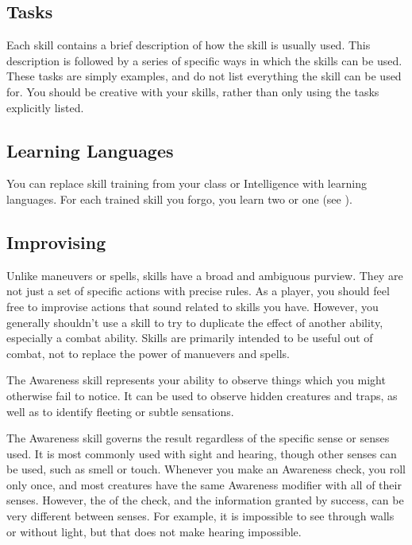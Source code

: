     \subsection{Tasks}\label{Tasks}
        Each skill contains a brief description of how the skill is usually used.
        This description is followed by a series of specific ways in which the skills can be used.
        These tasks are simply examples, and do not list everything the skill can be used for.
        You should be creative with your skills, rather than only using the tasks explicitly listed.

    \subsection{Learning Languages}
        You can replace skill training from your class or Intelligence with learning languages.
        For each trained skill you forgo, you learn two  or one  (see ).

    \subsection{Improvising}
        Unlike maneuvers or spells, skills have a broad and ambiguous purview.
        They are not just a set of specific actions with precise rules.
        As a player, you should feel free to improvise actions that sound related to skills you have.
        However, you generally shouldn't use a skill to try to duplicate the effect of another ability, especially a combat ability.
        Skills are primarily intended to be useful out of combat, not to replace the power of manuevers and spells.

\newpage
{}
    The Awareness skill represents your ability to observe things which you might otherwise fail to notice.
    It can be used to observe hidden creatures and traps, as well as to identify fleeting or subtle sensations. 

    The Awareness skill governs the result regardless of the specific sense or senses used.
    It is most commonly used with sight and hearing, though other senses can be used, such as smell or touch.
    Whenever you make an Awareness check, you roll only once, and most creatures have the same Awareness modifier with all of their senses.
    However, the  of the check, and the information granted by success, can be very different between senses.
    For example, it is impossible to see through walls or without light, but that does not make hearing impossible.

